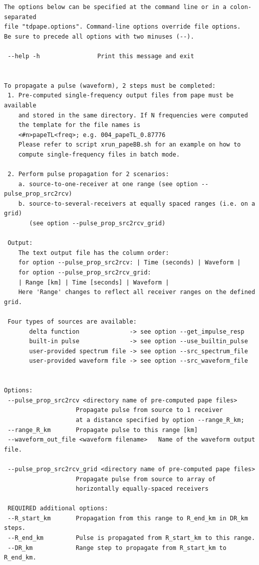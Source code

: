 \begin{verbatim}
The options below can be specified at the command line or in a colon-separated
file "tdpape.options". Command-line options override file options.
Be sure to precede all options with two minuses (--).

 --help -h                Print this message and exit


To propagate a pulse (waveform), 2 steps must be completed:
 1. Pre-computed single-frequency output files from pape must be available
    and stored in the same directory. If N frequencies were computed
    the template for the file names is
    <#n>papeTL<freq>; e.g. 004_papeTL_0.87776
    Please refer to script xrun_papeBB.sh for an example on how to
    compute single-frequency files in batch mode. 

 2. Perform pulse propagation for 2 scenarios:
    a. source-to-one-receiver at one range (see option --pulse_prop_src2rcv)
    b. source-to-several-receivers at equally spaced ranges (i.e. on a grid)
       (see option --pulse_prop_src2rcv_grid)

 Output:  
    The text output file has the column order:
    for option --pulse_prop_src2rcv: | Time (seconds) | Waveform | 
    for option --pulse_prop_src2rcv_grid:
    | Range [km] | Time [seconds] | Waveform |
    Here 'Range' changes to reflect all receiver ranges on the defined grid.

 Four types of sources are available:
       delta function              -> see option --get_impulse_resp
       built-in pulse              -> see option --use_builtin_pulse
       user-provided spectrum file -> see option --src_spectrum_file
       user-provided waveform file -> see option --src_waveform_file


Options:
 --pulse_prop_src2rcv <directory name of pre-computed pape files> 
                    Propagate pulse from source to 1 receiver
                    at a distance specified by option --range_R_km; 
 --range_R_km       Propagate pulse to this range [km]
 --waveform_out_file <waveform filename>   Name of the waveform output file.

 --pulse_prop_src2rcv_grid <directory name of pre-computed pape files>
                    Propagate pulse from source to array of 
                    horizontally equally-spaced receivers

 REQUIRED additional options:
 --R_start_km       Propagation from this range to R_end_km in DR_km steps.
 --R_end_km         Pulse is propagated from R_start_km to this range.
 --DR_km            Range step to propagate from R_start_km to R_end_km.


\end{verbatim}
